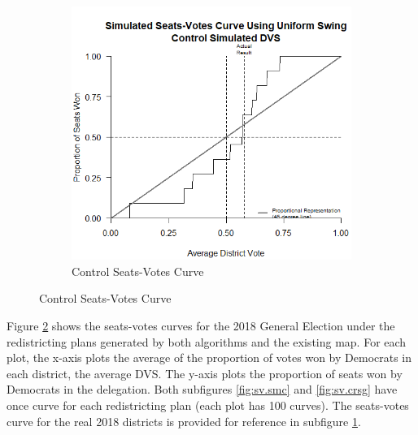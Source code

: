 \begin{figure}
    \begin{subfigure}[b]{0.475\textwidth}
        \centering
        \includegraphics[width=\textwidth]{img/sv.control.png}
        \caption{Control Seats-Votes Curve}
        \label{fig:sv.control}
    \end{subfigure}
    \label{fig:sv}
    \raggedright
\end{figure}

Figure \ref{fig:sv} shows the seats-votes curves \parencite{katz2020} for the 2018 General Election under the redistricting plans generated by both algorithms and the existing map. For each plot, the x-axis plots the average of the proportion of votes won by Democrats in each district, the average DVS. The y-axis plots the proportion of seats won by Democrats in the delegation. Both subfigures \ref{fig:sv.smc} and \ref{fig:sv.crsg} have once curve for each redistricting plan (each plot has 100 curves). The seats-votes curve for the real 2018 districts is provided for reference in subfigure \ref{fig:sv.control}.


